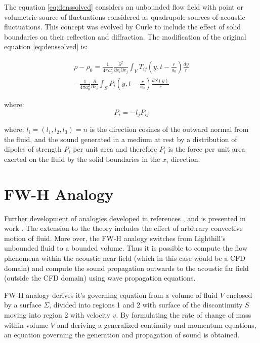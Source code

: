 The equation \ref{eq:denssolved} considers an unbounded flow field with point or volumetric source of fluctuations considered as quadrupole sources of acoustic fluctuations. This concept was evolved by Curle \citep{curle} to include the effect of solid boundaries on their reflection and diffraction. The modification of the original equation \ref{eq:denssolved} is:

\begin{equation} \label{eq:denscurle}
\begin{split}
\rho - \rho_0 = \frac{1}{4 \pi a_0^2} \frac{\partial^2}{\partial x_i \partial x_j}
\int_V T_{ij} \left(y, t - \frac{r}{a_0} \right) \frac{dy}{r} \\
- \frac{1}{4 \pi a_0^2} \frac{\partial}{\partial x_i}
\int_S P_i \left(y, t - \frac{r}{a_0} \right) \frac{dS(y)}{r}
\end{split}
\end{equation}

\noindent where:
\begin{equation} \label{eq:curlePi}
P_i = -l_j P_{ij}
\end{equation}

\noindent where: $l_i = (l_1, l_2, l_3) = n$ is the direction cosines of the outward normal from the fluid, and the sound generated in a medium at rest by a distribution of dipoles of strength $P_i$ per unit area and therefore $P_i$ is the force per unit area exerted on the fluid by the solid boundaries in the $x_i$ direction.



\section{FW-H Analogy}
Further development of analogies developed in references \citep{Light1}, \citep{Light2} and \citep{curle} is presented in work \citep{FWH}. The extension to the theory includes the effect of arbitrary convective motion of fluid. More over, the FW-H analogy switches from Lighthill's unbounded fluid to a bounded volume. Thus it is possible to compute the flow phenomena within the acoustic near field (which in this case would be a CFD domain) and compute the sound propagation outwards to the acoustic far field (outside the CFD domain) using wave propagation equations.

FW-H analogy derives it's governing equation from a volume of fluid $V$ enclosed by a surface $\Sigma$, divided into regions 1 and 2 with surface of the discontinuity $S$ moving into region 2 with velocity $v$. By formulating the rate of change of mass within volume $V$ and deriving a generalized continuity and momentum equations, an equation governing the generation and propagation of sound is obtained.

